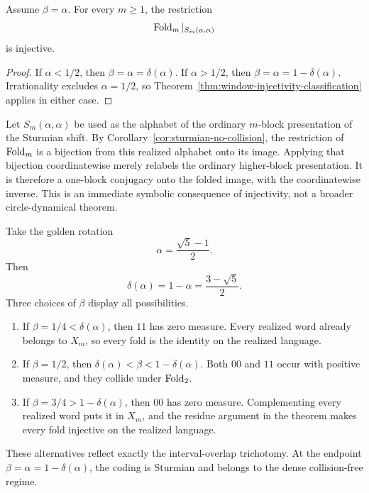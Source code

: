 \begin{corollary}
\label{cor:sturmian-no-collision}
Assume \(\beta=\alpha\).  For every \(m\geq1\), the restriction
\[
\operatorname{Fold}_m|_{S_m(\alpha,\alpha)}
\]
is injective.
\end{corollary}

\begin{proof}
If \(\alpha<1/2\), then
\(\beta=\alpha=\delta(\alpha)\).  If \(\alpha>1/2\), then
\(\beta=\alpha=1-\delta(\alpha)\).  Irrationality excludes
\(\alpha=1/2\), so Theorem~\ref{thm:window-injectivity-classification}
applies in either case.
\end{proof}

\begin{remark}\label{rem:higher-block}
Let \(S_m(\alpha,\alpha)\) be used as the alphabet of the ordinary
\(m\)-block presentation of the Sturmian shift.  By
Corollary~\ref{cor:sturmian-no-collision}, the restriction of \(\operatorname{Fold}_m\)
is a bijection from this realized alphabet onto its image.  Applying that
bijection coordinatewise merely relabels the ordinary higher-block
presentation.  It is therefore a one-block conjugacy onto the folded image,
with the coordinatewise inverse.  This is an immediate symbolic consequence
of injectivity, not a broader circle-dynamical theorem.
\end{remark}

\begin{example}\label{ex:three-regimes}
Take the golden rotation
\[
\alpha=\frac{\sqrt5-1}{2}.
\]
Then
\[
\delta(\alpha)=1-\alpha=\frac{3-\sqrt5}{2}.
\]
Three choices of \(\beta\) display all possibilities.
\begin{enumerate}
\item If \(\beta=1/4<\delta(\alpha)\), then \(11\) has zero measure.
Every realized word already belongs to \(X_m\), so every fold is the
identity on the realized language.
\item If \(\beta=1/2\), then
\(\delta(\alpha)<\beta<1-\delta(\alpha)\).  Both \(00\) and \(11\) occur
with positive measure, and they collide under \(\operatorname{Fold}_2\).
\item If \(\beta=3/4>1-\delta(\alpha)\), then \(00\) has zero measure.
Complementing every realized word puts it in \(X_m\), and the residue
argument in the theorem makes every fold injective on the realized
language.
\end{enumerate}
These alternatives reflect exactly the interval-overlap trichotomy.
At the endpoint \(\beta=\alpha=1-\delta(\alpha)\), the coding is Sturmian
and belongs to the dense collision-free regime.
\end{example}

